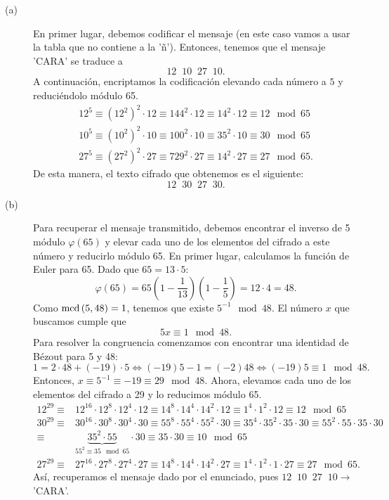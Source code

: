\documentclass{article}
\begin{document}
\begin{sol}
\begin{description}
\item[(a)] En primer lugar, debemos codificar el mensaje (en este caso vamos a usar la tabla que no contiene a la 'ñ'). Entonces, tenemos que el mensaje 'CARA' se traduce a 
	\[12 \;\; 10 \;\; 27 \;\; 10 .\]
A continuación, encriptamos la codificación elevando cada número a $\displaystyle 5 $ y reduciéndolo módulo 65.
\[
\begin{split}
12^{5} \equiv \left(12^{2}\right)^{2} \cdot 12 \equiv 144^{2} \cdot 12 \equiv 14^{2} \cdot 12 \equiv 12 \mod 65 \\
10^{5} \equiv \left(10^{2}\right)^{2} \cdot 10 \equiv 100^{2} \cdot 10 \equiv 35^{2} \cdot 10 \equiv 30 \mod 65 \\
27^{5} \equiv \left(27^{2}\right)^{2} \cdot 27 \equiv 729^{2} \cdot 27 \equiv 14^{2} \cdot 27 \equiv 27 \mod 65.
\end{split}
\]
De esta manera, el texto cifrado que obtenemos es el siguiente:
\[12 \; \; 30 \; \; 27 \; \; 30 .\]
\item[(b)] Para recuperar el mensaje transmitido, debemos encontrar el inverso de 5 módulo $\displaystyle \varphi\left(65\right) $  y elevar cada uno de los elementos del cifrado a este número y reducirlo módulo 65. En primer lugar, calculamos la función de Euler para 65. Dado que $\displaystyle 65 = 13 \cdot 5 $:
	\[\varphi\left(65\right) = 65\left(1-\frac{1}{13}\right)\left(1-\frac{1}{5}\right) = 12 \cdot 4 = 48 .\]
Como $\displaystyle \text{mcd}\left(5,48\right) = 1 $, tenemos que existe $\displaystyle 5^{-1} \mod 48 $. El número $\displaystyle x $ que buscamos cumple que 
\[5x \equiv 1 \mod 48 .\]
Para resolver la congruencia comenzamos con encontrar una identidad de Bézout para 5 y 48:
\[1 = 2 \cdot 48 + \left(-19\right) \cdot 5 \iff \left(-19\right)5-1 = \left(-2\right)48 \iff \left(-19\right)5 \equiv 1 \mod 48.\]
Entonces, $\displaystyle x\equiv5^{-1} \equiv -19 \equiv 29 \mod 48 $. Ahora, elevamos cada uno de los elementos del cifrado a 29 y lo reducimos módulo 65.
\[
\begin{split}
	12^{29} \equiv & 12^{16} \cdot 12^{8} \cdot 12^{4} \cdot 12 \equiv 14^{8} \cdot 14^{4} \cdot 14^{2} \cdot 12 \equiv 1^{4} \cdot 1^{2} \cdot 12 \equiv 12 \mod 65 \\
	30^{29} \equiv & 30^{16} \cdot 30^{8} \cdot 30^{4} \cdot 30 \equiv 55^{8} \cdot 55^{4} \cdot 55^{2} \cdot 30 \equiv 35^{4} \cdot 35^{2} \cdot 35 \cdot 30 \equiv 55^{2} \cdot 55 \cdot 35 \cdot 30 \\  \equiv & \underbrace{35^{2} \cdot 55}_{55^{2} \equiv 35 \mod65} \cdot 30 \equiv 35 \cdot 30 \equiv 10 \mod 65 \\
	27^{29} \equiv & 27^{16} \cdot 27 ^{8} \cdot 27^{4} \cdot 27 \equiv 14^{8} \cdot 14^{4} \cdot 14^{2} \cdot 27 \equiv 1^{4} \cdot 1^{2} \cdot 1 \cdot 27 \equiv 27 \mod 65.
\end{split}
\]
Así, recuperamos el mensaje dado por el enunciado, pues $\displaystyle 12 \; \; 10 \; \; 27 \; \; 10 \to $ 'CARA'.
\end{description}
\end{sol}
\end{document}
